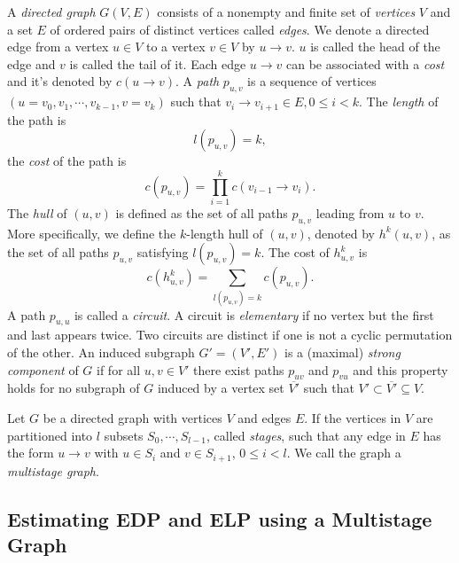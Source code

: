 A \textit{directed graph} $G(V, E)$ consists of a nonempty and finite set of \textit{vertices} $V$ and a set $E$ of ordered pairs of distinct vertices called \textit{edges}. We denote a directed edge from a vertex $u\in V$ to a vertex $v\in V$ by $u\rightarrow v$. $u$ is called the head of the edge and $v$ is called the tail of it. Each edge $u\rightarrow v$ can be associated with a \textit{cost} and it's denoted by $c(u\rightarrow v)$. A \textit{path} $p_{u,v}$ is a sequence of vertices $(u=v_0,v_1,\cdots,v_{k-1},v=v_k)$ such that $v_i\rightarrow v_{i+1}\in E, 0\leq i<k$. The \textit{length} of the path is
\[
    l(p_{u,v})=k,
\]
the \textit{cost} of the path is
\[
    c(p_{u,v})=\prod\limits_{i=1}^{k}c(v_{i-1}\rightarrow v_i).
\]
The \textit{hull} of $(u,v)$ is defined as the set of all paths $p_{u,v}$ leading from $u$ to $v$. More specifically, we define the $k$-length hull of $(u,v)$, denoted by $h^k(u,v)$, as the set of all paths $p_{u,v}$ satisfying $l(p_{u,v})=k$. The cost of $h^k_{u,v}$ is
\[
    c(h^k_{u,v})=\sum\limits_{l(p_{u,v})=k} c(p_{u,v}).
\]
A path $p_{u,u}$ is called a \textit{circuit}. A circuit is \textit{elementary} if no vertex but the first and last appears twice. Two circuits are distinct if one is not a cyclic permutation of the other. An induced subgraph $G'=(V',E')$ is a (maximal) \textit{strong component} of $G$ if for all $u, v\in V'$ there exist paths $p_{uv}$ and $p_{vu}$ and this property holds for no subgraph of $G$ induced by a vertex set $\overline{V'}$ such that $V' \subset \overline{V'} \subseteq V$.

Let $G$ be a directed graph with vertices $V$ and edges $E$. If the vertices in $V$ are partitioned into $l$ subsets $S_0,\cdots,S_{l-1}$, called \textit{stages}, such that any edge in $E$ has the form $u\rightarrow v$ with $u\in S_i$ and $v\in S_{i+1}$, $0\leq i<l$. We call the graph a \textit{multistage graph}.


\subsection{Estimating EDP and ELP using a Multistage Graph}

